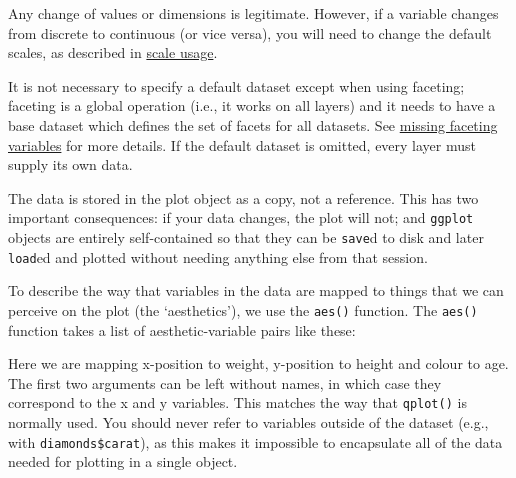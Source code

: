 Any change of values or dimensions is legitimate. However, if a variable
changes from discrete to continuous (or vice versa), you will need to
change the default scales, as described in
\hyperref[sec:scale-usage]{scale usage}.

It is not necessary to specify a default dataset except when using
faceting; faceting is a global operation (i.e., it works on all layers)
and it needs to have a base dataset which defines the set of facets for
all datasets. See \hyperref[sub:missing-faceting-columns]{missing
faceting variables} for more details. If the default dataset is omitted,
every layer must supply its own data.

The data is stored in the plot object as a copy, not a reference. This
has two important consequences: if your data changes, the plot will not;
and \texttt{ggplot} objects are entirely self-contained so that they can
be \texttt{save}d to disk and later \texttt{load}ed and plotted without
needing anything else from that session.


To describe the way that variables in the data are mapped to things that
we can perceive on the plot (the `aesthetics'), we use the
\texttt{aes()} function. The \texttt{aes()} function takes a list of
aesthetic-variable pairs like these: 
 

\begin{Shaded}
\begin{Highlighting}[]
\NormalTok{(}   
\end{Highlighting}
\end{Shaded}

Here we are mapping x-position to weight, y-position to height and
colour to age. The first two arguments can be left without names, in
which case they correspond to the x and y variables. This matches the
way that \texttt{qplot()} is normally used. You should never refer to
variables outside of the dataset (e.g., with \texttt{diamonds\$carat}),
as this makes it impossible to encapsulate all of the data needed for
plotting in a single object.

\begin{Shaded}
\begin{Highlighting}[]
 
\end{Highlighting}
\end{Shaded}

